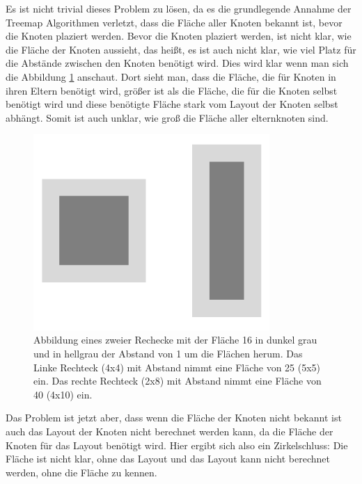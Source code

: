 Es ist nicht trivial dieses Problem zu lösen, da es die grundlegende Annahme der Treemap Algorithmen verletzt, dass die Fläche aller Knoten bekannt ist, bevor die Knoten plaziert werden. 
Bevor die Knoten plaziert werden, ist nicht klar, wie die Fläche der Knoten aussieht, das heißt, es ist auch nicht klar, wie viel Platz für die Abstände zwischen den Knoten benötigt wird. Dies wird klar wenn man sich die Abbildung \ref{fig:marginAreaDifference} anschaut. Dort sieht man, dass die Fläche, die für Knoten in ihren Eltern benötigt wird, größer ist als die Fläche, die für die Knoten selbst benötigt wird und diese benötigte Fläche stark vom Layout der Knoten selbst abhängt. Somit ist auch unklar, wie groß die Fläche aller elternknoten sind. 

\begin{figure}
    \centering
    \includegraphics[width=0.8\textwidth]{images/marginArea.png}
    \caption{Abbildung eines zweier Rechecke mit der Fläche 16 in dunkel grau und in hellgrau der Abstand von 1 um die Flächen herum. Das Linke Rechteck (4x4) mit Abstand nimmt eine Fläche von 25 (5x5) ein. Das rechte Rechteck (2x8) mit Abstand nimmt eine Fläche von 40 (4x10) ein.}
    \label{fig:marginAreaDifference}
\end{figure}

Das Problem ist jetzt aber, dass wenn die Fläche der Knoten nicht bekannt ist auch das Layout der Knoten nicht berechnet werden kann, da die Fläche der Knoten für das Layout benötigt wird. Hier ergibt sich also ein Zirkelschluss: Die Fläche ist nicht klar, ohne das Layout und das Layout kann nicht berechnet werden, ohne die Fläche zu kennen.
